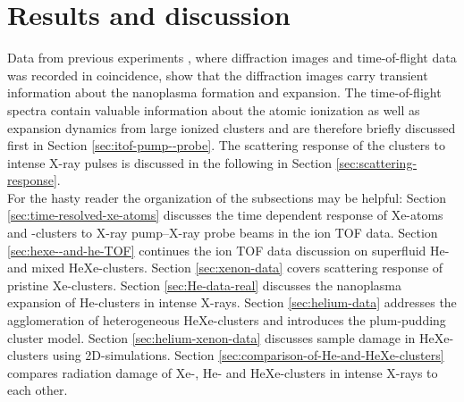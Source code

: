 \chapter{Results and discussion}\label{ch:results}
Data from previous experiments \cite{Bostedt-2012-PRL,Gorkhover-2016-NatPho,Ferguson-2016-SciAdv}, where diffraction images and time-of-flight data was recorded in coincidence, show that the diffraction images carry transient information about the nanoplasma formation and expansion. The time-of-flight spectra contain valuable information about the atomic ionization as well as expansion dynamics from large ionized clusters and are therefore briefly discussed first in Section \ref{sec:itof-pump--probe}. The scattering response of the clusters to intense X-ray pulses is discussed in the following in Section \ref{sec:scattering-response}.\\[1\baselineskip]
%
For the hasty reader the organization of the subsections may be helpful: Section \ref{sec:time-resolved-xe-atoms} discusses the time dependent response of Xe-atoms and -clusters to X-ray pump--X-ray probe beams in the ion TOF data. Section \ref{sec:hexe--and-he-TOF} continues the ion TOF data discussion on superfluid He- and mixed HeXe-clusters. Section \ref{sec:xenon-data} covers scattering response of pristine Xe-clusters. Section \ref{sec:He-data-real} discusses the nanoplasma expansion of He-clusters in intense X-rays. Section \ref{sec:helium-data} addresses the agglomeration of heterogeneous HeXe-clusters and introduces the plum-pudding cluster model. Section \ref{sec:helium-xenon-data} discusses sample damage in HeXe-clusters using 2D-simulations. Section \ref{sec:comparison-of-He-and-HeXe-clusters} compares radiation damage of Xe-, He- and HeXe-clusters in intense X-rays to each other.\\[1\baselineskip]
